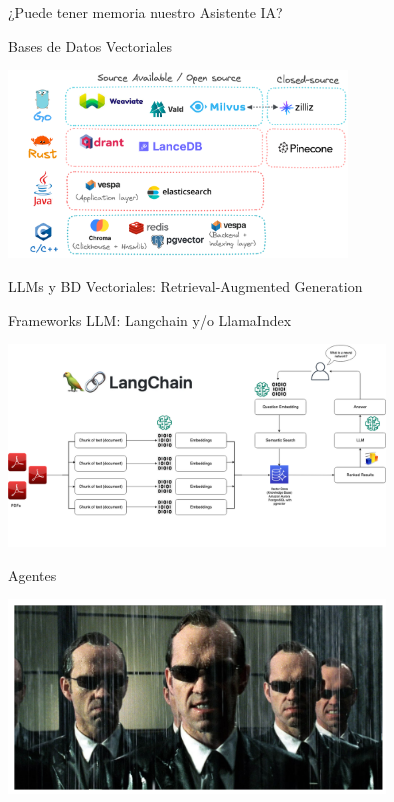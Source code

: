 \documentclass[table, unknownkeysallowed, 10pt]{beamer}
\begin{document}
\begin{frame}{¿Puede tener memoria nuestro Asistente IA?}

    \begin{block}{Bases de Datos Vectoriales}
    \begin{center}
        \includegraphics[width=9cm]{imagenes/tiposVectorDB.png}
    \end{center}
\end{block}
\end{frame}

\begin{frame}{LLMs y BD Vectoriales: Retrieval-Augmented Generation}
    \begin{block}{Frameworks LLM: Langchain y/o LlamaIndex}
    \begin{center}
        \includegraphics[width=10cm]{imagenes/langchain.png}
    \end{center}
\end{block}
\end{frame}

\begin{frame}{Agentes}
    \begin{center}
        \includegraphics[width=10cm]{imagenes/agentSmith.png}
    \end{center}

\end{frame}
\end{document}
